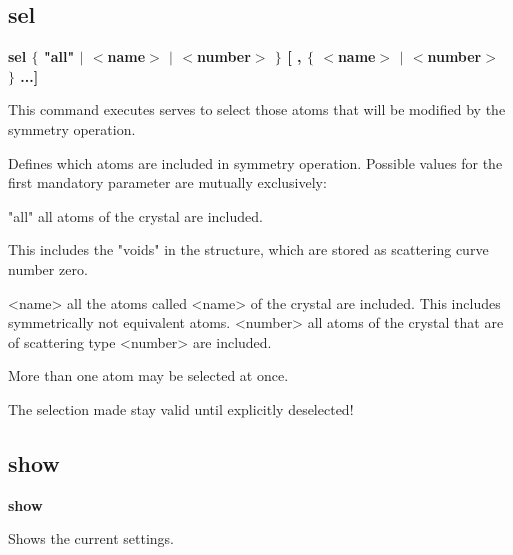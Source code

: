 \subsection*{sel}
{\bf sel $ \{$ "all" $| $ $ <$name$> $ $| $ $ <$number$> $ $\} $ [ , $ \{$ $ <$name$> $ $| $ $ <$number$> $ $\} $ ...] \par }
\par
\vspace{3pt}
This command executes serves to select 
those atoms that will be modified by the symmetry operation. 
\par
Defines which atoms are included in symmetry operation. Possible values 
for the first mandatory parameter are mutually exclusively: 
\par
\begin{MacVerbatim}
"all"     all atoms of the crystal are included.
\end{MacVerbatim}
          This includes the "voids" in the structure, which are stored 
          as scattering curve number zero. 
\begin{MacVerbatim}
<name>    all the atoms called <name> of the crystal are included.
          This includes symmetrically not equivalent atoms.
<number>  all atoms of the crystal that are of scattering type <number>
          are included.
\end{MacVerbatim}
More than one atom may be selected at once. 
\par
The selection made stay valid until explicitly deselected! 
\subsection*{show}
{\bf show \par }
\par
\vspace{3pt}
Shows the current settings. 
